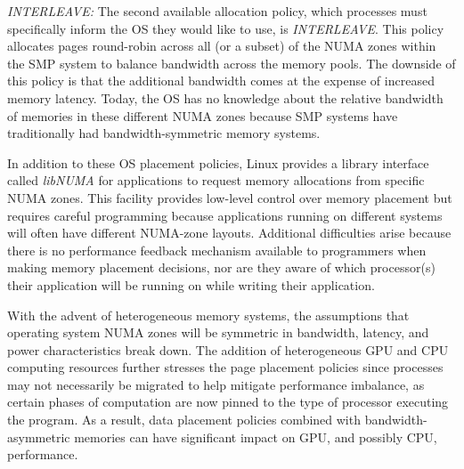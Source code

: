 \emph{INTERLEAVE:} The second available allocation policy, which processes
must specifically inform the OS they would like to use, is \emph{INTERLEAVE}\@. This
policy allocates pages round-robin across all (or a subset)
of the NUMA zones within the SMP system to balance bandwidth across the memory pools.
The downside of this policy is that the additional bandwidth comes at the expense of
increased memory latency. Today, the OS has no knowledge about the relative 
bandwidth of memories in these different NUMA zones because SMP
systems have traditionally had bandwidth-symmetric memory systems.

In addition to these OS placement policies, Linux provides a library interface called \textit{libNUMA}
for applications to request memory allocations from
specific NUMA zones.  This facility provides low-level control over memory placement
but requires careful programming because applications running on different systems will often have
different NUMA-zone layouts.  Additional difficulties arise because there is no performance
feedback mechanism available to programmers when making memory placement decisions, nor are they
aware of which processor(s) their application will be running on while writing their application.

With the advent of heterogeneous memory systems, the assumptions
that operating system NUMA zones will be symmetric in bandwidth, latency, and power characteristics break down.  
The addition of heterogeneous GPU and CPU computing resources further stresses the page placement
policies since processes may not necessarily be migrated to help 
mitigate performance imbalance, as 
certain phases of computation are now pinned to the type of processor executing the program.
As a result, data placement policies combined with bandwidth-asymmetric
memories can have significant impact on GPU, and possibly CPU, performance.


